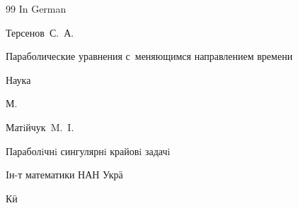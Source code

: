 \begin{thebibliography}{99}
\lang In German







\by Терсенов~С.~А.

\book Параболические уравнения с~меняющимся направлением времени


\publ Наука

\publaddr М.














\by Матiйчук~M.~I.

\book Параболiчнi сингулярнi крайовi задачi


\publ Iн-т математики НАН Укра\"

\publaddr Ки\"















\end{thebibliography}
